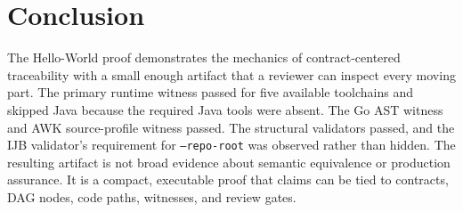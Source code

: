 \documentclass[11pt,letterpaper]{article}
\begin{document}
\section{Conclusion}

The Hello-World proof demonstrates the mechanics of contract-centered
traceability with a small enough artifact that a reviewer can inspect
every moving part. The primary runtime witness passed for five available
toolchains and skipped Java because the required Java tools were absent.
The Go AST witness and AWK source-profile witness passed. The structural
validators passed, and the IJB validator's requirement for
\texttt{--repo-root} was observed rather than hidden. The resulting
artifact is not broad evidence about semantic equivalence or production
assurance. It is a compact, executable proof that claims can be tied to
contracts, DAG nodes, code paths, witnesses, and review gates.



\end{document}
